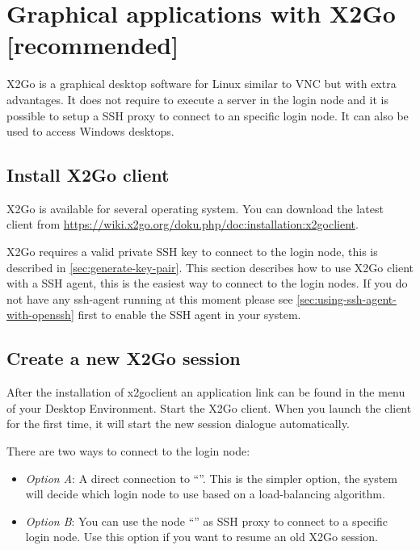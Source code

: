 \chapter{Graphical applications with X2Go [recommended]}
\label{ch:x2go}

X2Go is a graphical desktop software for Linux similar to VNC but with extra advantages.
It does not require to execute a server in the login node and it is possible to setup a SSH proxy to
connect to an specific login node.
It can also be used to access Windows desktops. 


\section{Install X2Go client}
\label{sec:x2go-client}
X2Go is available for several operating system. You can download the latest client from 
\url{https://wiki.x2go.org/doku.php/doc:installation:x2goclient}.

X2Go requires a valid private SSH key to connect to the login node, this is described in \autoref{sec:generate-key-pair}.
This section describes how to use X2Go client with a SSH agent, this is the easiest way to connect to the login nodes.
If you do not have any ssh-agent running at this moment please see \autoref{sec:using-ssh-agent-with-openssh} first to enable the
SSH agent in your system.


\section{Create a new X2Go session}
\label{sec:sessions-x2go}

After the installation of x2goclient an application link can be found in the menu of your Desktop Environment.
Start the X2Go client. When you launch the client for the first time, it will start the new session dialogue automatically.

There are two ways to connect to the login node:
\begin{itemize}
\item \emph{Option A}: A direct connection to ``\strong{\emph{\loginnode}}''. This is the simpler option, the system will decide which
login node to use based on a load-balancing algorithm.
\item \emph{Option B}: You can use the node ``\strong{\emph{\loginnode}}'' as SSH proxy to connect to a specific login node. Use this option if you want to resume an old X2Go session.
\end{itemize}

